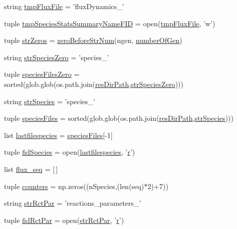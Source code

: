 \begin{DoxyCompactItemize}
\item 
string \hyperlink{a00092_a170166907641e54151f8d83d51420165}{tmp\-Flux\-File} = 'flux\-Dynamics\-\_\-'
\item 
tuple \hyperlink{a00092_a0b5b14621851cbf162c61aa936ca5f2d}{tmp\-Species\-Stats\-Summary\-Name\-F\-I\-D} = open(\hyperlink{a00092_a170166907641e54151f8d83d51420165}{tmp\-Flux\-File}, 'w')
\item 
tuple \hyperlink{a00092_abfa8fbc48a0ad5b6dff6914d6052b2b6}{str\-Zeros} = \hyperlink{a00092_ad40fd27cb36a2086a2b8d0acadd4dbc9}{zero\-Before\-Str\-Num}(ngen, \hyperlink{a00092_acd3059fa3a61438f739193dc80f23b80}{number\-Of\-Gen})
\item 
string \hyperlink{a00092_a658920d97b6df23e672e290d362033b4}{str\-Species\-Zero} = 'species\-\_\-'
\item 
tuple \hyperlink{a00092_a8c18127c32adcc1a3403749a047270e5}{species\-Files\-Zero} = sorted(glob.\-glob(os.\-path.\-join(\hyperlink{a00092_abc625ab1aeed5741a02bbaccfbee5c06}{res\-Dir\-Path},\hyperlink{a00092_a658920d97b6df23e672e290d362033b4}{str\-Species\-Zero})))
\item 
string \hyperlink{a00092_a36518d8de93502466a6d4b2e62eb7734}{str\-Species} = 'species\-\_\-'
\item 
tuple \hyperlink{a00092_ae41c9dafcdeb581e70eeb889d16c6551}{species\-Files} = sorted(glob.\-glob(os.\-path.\-join(\hyperlink{a00092_abc625ab1aeed5741a02bbaccfbee5c06}{res\-Dir\-Path},\hyperlink{a00092_a36518d8de93502466a6d4b2e62eb7734}{str\-Species})))
\item 
list \hyperlink{a00092_a887b4124ed717643d4e79b6d9597109f}{lastfilespecies} = \hyperlink{a00092_ae41c9dafcdeb581e70eeb889d16c6551}{species\-Files}\mbox{[}-\/1\mbox{]}
\item 
tuple \hyperlink{a00092_ad38778cd180f00344e8a8d68511f56fd}{fid\-Species} = open(\hyperlink{a00092_a887b4124ed717643d4e79b6d9597109f}{lastfilespecies}, '\hyperlink{a00025_ac862e7284527eb913b1351c8bfb8e079}{r}')
\item 
list \hyperlink{a00092_a99cfaccf97d11133896704acd137057d}{flux\-\_\-seq} = \mbox{[}$\,$\mbox{]}
\item 
tuple \hyperlink{a00092_ab6476d4caeb73c29cf068374a1c8285d}{counters} = np.\-zeros((n\-Species,(len(seq)$\ast$2)+7))
\item 
string \hyperlink{a00092_ac571c8d78a216f58ebc1e37bef25a541}{str\-Rct\-Par} = 'reactions\-\_\-parameters\-\_\-'
\item 
tuple \hyperlink{a00092_af949c46aab0625cd7bbed10b8a484f8b}{fid\-Rct\-Par} = open(\hyperlink{a00092_ac571c8d78a216f58ebc1e37bef25a541}{str\-Rct\-Par}, '\hyperlink{a00025_ac862e7284527eb913b1351c8bfb8e079}{r}')

\end{DoxyCompactItemize}
